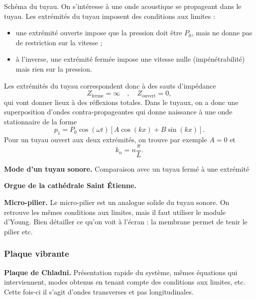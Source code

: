 Schéma du tuyau.
On s'intéresse à une onde acoustique se propageant dans le tuyau.
Les extrémités du tuyau imposent des conditions aux limites :
\begin{itemize}
\item une extrémité ouverte impose que la pression doit être $P_0$, mais ne donne pas de restriction sur la vitesse ;
\item à l'inverse, une extrémité fermée impose une vitesse nulle (impénétrabilité) mais rien sur la pression.
\end{itemize}
Les extrémités du tuyau correspondent donc à des sauts d'impédance
\begin{equation}
Z_\mathrm{ferme} = \infty \quad , \quad Z_\mathrm{ouvert} = 0,
\end{equation}
qui vont donner lieux à des réflexions totales.
Dans le tuyaux, on a donc une superposition d'ondes contra-propageantes qui donne naissance à une onde stationnaire de la forme
\begin{equation}
p_1 = P_0 \cos(\omega t) \left[ A\cos(kx) + B\sin(kx) \right].
\end{equation}
Pour un tuyau ouvert aux deux extrémités, on trouve par exemple $A=0$ et
\begin{equation}
k_n = n\frac{\pi}{L}.
\end{equation}
\begin{slide}
\textbf{Mode d'un tuyau sonore.} Comparaison avec un tuyau fermé à une extrémité
\end{slide}
\begin{slide}
\textbf{Orgue de la cathédrale Saint Étienne.}
\end{slide}
\begin{slide}
\textbf{Micro-pilier.} Le micro-pilier est un analogue solide du tuyau sonore.
On retrouve les mêmes conditions aux limites, mais il faut utiliser le module d'Young.
Bien détailler ce qu'on voit à l'écran : la membrane permet de tenir le pilier etc.
\end{slide}

\subsubsection{Plaque vibrante}

\begin{slide}
\textbf{Plaque de Chladni.}
Présentation rapide du système, mêmes équations qui interviennent, modes obtenus en tenant compte des conditions aux limites, etc.
Cette fois-ci il s'agit d'ondes transverses et pas longitudinales.
\end{slide}

